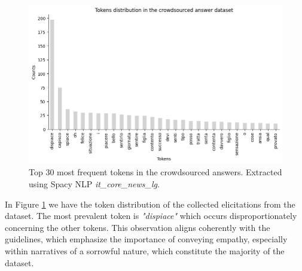 \begin{figure}[!htbp]
    \centering
    \includegraphics[width=1\linewidth]{assets//imgs/dataset-top-30-answers.png}
    \caption{Top 30 most frequent tokens in the crowdsourced answers. Extracted using Spacy NLP \textit{it\_core\_news\_lg}.}
    \label{fig:dataset-top-30-answers}
\end{figure}

In Figure \ref{fig:dataset-top-30-answers} we have the token distribution of the collected elicitations from the dataset. The most prevalent token is \emph{"dispiace"} which occurs disproportionately concerning the other tokens. This observation aligns coherently with the guidelines, which emphasize the importance of conveying empathy, especially within narratives of a sorrowful nature, which constitute the majority of the dataset.

